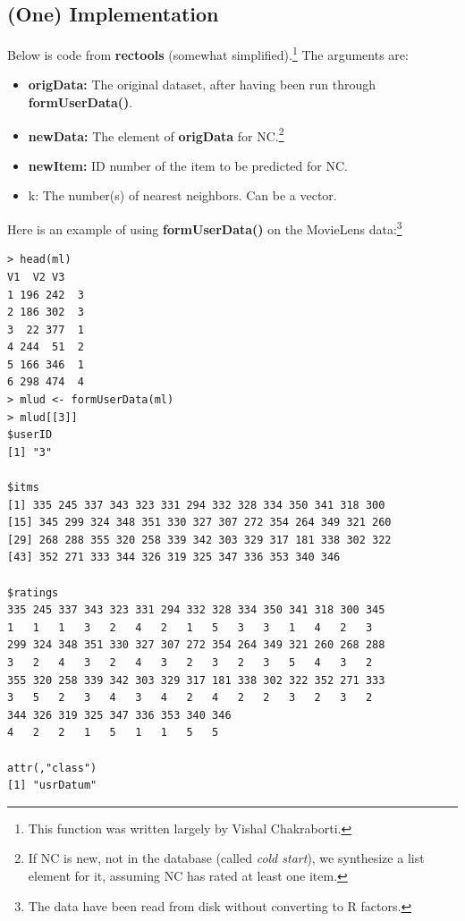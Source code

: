 \subsection{(One) Implementation}

Below is code from \textbf{rectools} (somewhat
simplified).\footnote{This function was written largely by Vishal
Chakraborti.} The arguments are:

\begin{itemize}

\item \textbf{origData:}  The original dataset, after having been run through
\textbf{formUserData()}. 

\item \textbf{newData:}  The element of \textbf{origData} for NC.\footnote{If
NC is new, not in the database (called \textit{cold start}), we
synthesize a list element for it, assuming NC has rated at least one
item.}

\item \textbf{newItem:}  ID number of the item to be predicted for NC.

\item k:  The number(s) of nearest neighbors.  Can be a vector.

\end{itemize} 

Here is an example of using \textbf{formUserData()} on the MovieLens
data:\footnote{The data have been read from disk without converting to R
factors.}

\begin{lstlisting}
> head(ml)
V1  V2 V3
1 196 242  3
2 186 302  3
3  22 377  1
4 244  51  2
5 166 346  1
6 298 474  4
> mlud <- formUserData(ml)
> mlud[[3]]
$userID
[1] "3"

$itms
[1] 335 245 337 343 323 331 294 332 328 334 350 341 318 300
[15] 345 299 324 348 351 330 327 307 272 354 264 349 321 260
[29] 268 288 355 320 258 339 342 303 329 317 181 338 302 322
[43] 352 271 333 344 326 319 325 347 336 353 340 346

$ratings
335 245 337 343 323 331 294 332 328 334 350 341 318 300 345 
1   1   1   3   2   4   2   1   5   3   3   1   4   2   3 
299 324 348 351 330 327 307 272 354 264 349 321 260 268 288 
3   2   4   3   2   4   3   2   3   2   3   5   4   3   2 
355 320 258 339 342 303 329 317 181 338 302 322 352 271 333 
3   5   2   3   4   3   4   2   4   2   2   3   2   3   2 
344 326 319 325 347 336 353 340 346 
4   2   2   1   5   1   1   5   5 

attr(,"class")
[1] "usrDatum"
\end{lstlisting}

